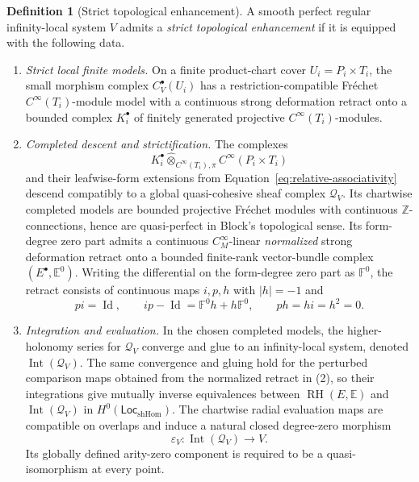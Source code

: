 \documentclass[12pt]{amsart}
\theoremstyle{definition}
\newtheorem{defn}[thm]{Definition}
\theoremstyle{remark}
\numberwithin{equation}{section}
\newcommand{\Z}{{\mathbb{Z}}}
\newcommand{\1}{{\mathbb{1}}}
\newcommand{\Loc}{\mathsf{Loc}}
\newcommand{\RH}{\operatorname{RH}}
\newcommand{\id}{\operatorname{Id}}
\begin{document}
\begin{defn}[Strict topological enhancement]
\label{def:strict-model}
A smooth perfect regular infinity-local system $V$ admits a
\emph{strict topological enhancement} if it is equipped with the
following data.
\begin{enumerate}
 \item \emph{Strict local finite models.}  On a finite product-chart
 cover $U_i=P_i\times T_i$, the small morphism complex
 $C_V^\bullet(U_i)$ has a restriction-compatible Fr\'echet
 $C^\infty(T_i)$-module model with a continuous strong deformation
 retract onto a bounded complex $K_i^\bullet$ of finitely generated
 projective $C^\infty(T_i)$-modules.
 \item \emph{Completed descent and strictification.}  The complexes
 \[
  K_i^\bullet
  \mathbin{\widehat\otimes_{C^\infty(T_i),\pi}}
  C^\infty(P_i\times T_i)
 \]
 and their leafwise-form extensions from
 Equation~\eqref{eq:relative-associativity} descend compatibly to a
 global quasi-cohesive sheaf complex $\mathcal Q_V$.  Its chartwise
 completed models are bounded projective Fr\'echet modules with
 continuous $\Z$-connections, hence are quasi-perfect in Block's
 topological sense.  Its form-degree zero part admits a continuous
 $C^\infty_M$-linear \emph{normalized} strong deformation retract onto
 a bounded finite-rank vector-bundle complex
 $(E^\bullet,\mathbb E^0)$.  Writing the differential on the
 form-degree zero part as $\mathbb F^0$, the retract consists of
 continuous maps $i,p,h$ with $|h|=-1$ and
 \[
  pi=\id,\qquad
  ip-\id=\mathbb F^0h+h\mathbb F^0,\qquad
  ph=hi=h^2=0.
 \]
 \item \emph{Integration and evaluation.}  In the chosen completed
 models, the higher-holonomy series for $\mathcal Q_V$ converge and
 glue to an infinity-local system, denoted
 $\operatorname{Int}(\mathcal Q_V)$.  The same convergence and gluing
 hold for the perturbed comparison maps obtained from the normalized
 retract in (2), so their integrations give mutually inverse
 equivalences between $\RH(E,\mathbb E)$ and
 $\operatorname{Int}(\mathcal Q_V)$ in
 $H^0(\Loc_{\mathrm{shHom}})$.  The chartwise radial
 evaluation maps are compatible on overlaps and induce a natural
 closed degree-zero morphism
 \[
  \varepsilon_V:
  \operatorname{Int}(\mathcal Q_V)\longrightarrow V.
 \]
 Its globally defined arity-zero component is required to be a
 quasi-isomorphism at every point.
\end{enumerate}
\end{defn}
\end{document}
